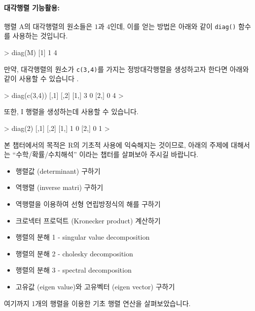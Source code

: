 \documentclass[tutorial.tex]{subfiles}
\begin{document}
\paragraph{대각행렬 기능활용: } 행렬 A의 대각행렬의 원소들은 $1$과 $4$인데, 이를 얻는 방법은 아래와 같이 \texttt{diag()} 함수를 사용하는 것입니다. 

\begin{Schunk}
\begin{Soutput}
> diag(M)
[1] 1 4
\end{Soutput}
\end{Schunk}

만약, 대각행렬의 원소가 \texttt{c(3,4)}를 가지는 정방대각행렬을 생성하고자 한다면 아래와 같이 사용할 수 있습니다 .

\begin{Schunk}
\begin{Soutput}
> diag(c(3,4))
     [,1] [,2]
[1,]    3    0
[2,]    0    4
> 
\end{Soutput}
\end{Schunk}

또한, I 행렬을 생성하는데 사용할 수 있습니다. 

\begin{Schunk}
\begin{Soutput}
> diag(2)
     [,1] [,2]
[1,]    1    0
[2,]    0    1
>
\end{Soutput}
\end{Schunk}

본 챕터에서의 목적은 R의 기초적 사용에 익숙해지는 것이므로, 아래의 주제에 대해서는 ``수학/확률/수치해석'' 이라는 챕터를 살펴보아 주시길 바랍니다.
\begin{itemize}
	\item 행렬값 (determinant) 구하기 
	\item 역행렬 (inverse matri) 구하기 
	\item 역행렬을 이용하여 선형 연립방정식의 해를 구하기
	\item 크로넥터 프로덕트 (Kronecker product) 계산하기 
	\item 행렬의 분해 1 - singular value decomposition 
	\item 행렬의 분해 2 - cholesky decomposition 
	\item 행렬의 분해 3 - spectral decomposition
	\item 고유값 (eigen value)와 고유벡터 (eigen vector) 구하기  
\end{itemize}

여기까지 1개의 행렬을 이용한 기초 행렬 연산을 살펴보았습니다. 
\end{document}
